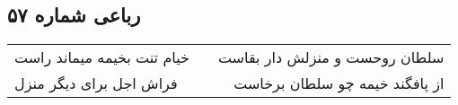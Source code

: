 \begin{center}
\section*{رباعی شماره ۵۷}
\label{sec:sh057}
\begin{longtable}{l p{0.5cm} r}
خیام تنت بخیمه میماند راست
&&
سلطان روحست و منزلش دار بقاست
\\
فراش اجل برای دیگر منزل
&&
از پافگند خیمه چو سلطان برخاست
\\
\end{longtable}
\end{center}
